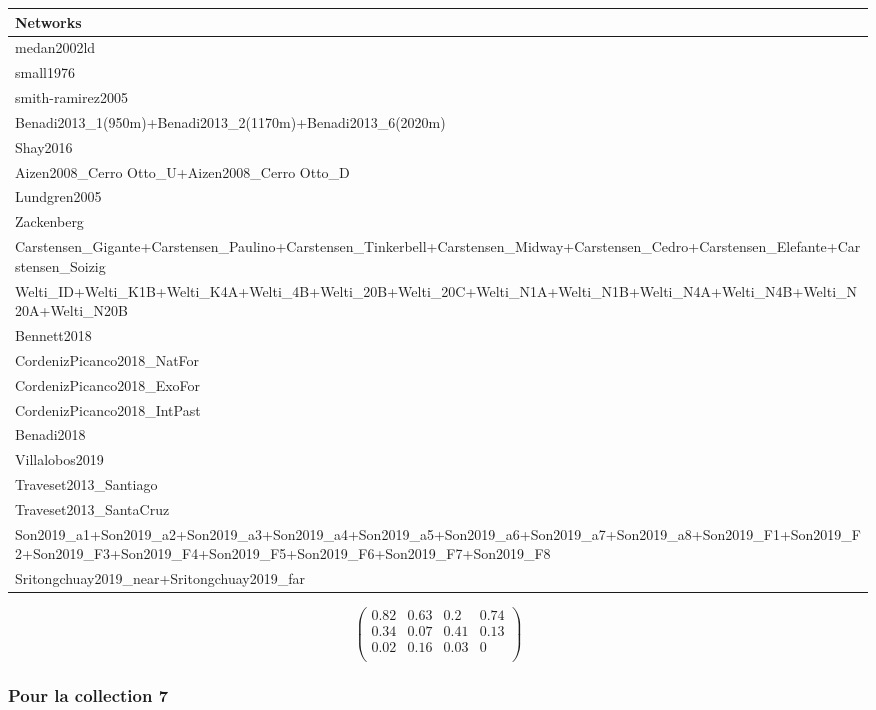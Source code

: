 \begin{tabular}{l}
\toprule
Networks\\
\midrule
medan2002ld\\
small1976\\
smith-ramirez2005\\
Benadi2013\_1(950m)+Benadi2013\_2(1170m)+Benadi2013\_6(2020m)\\
Shay2016\\
\addlinespace
Aizen2008\_Cerro Otto\_U+Aizen2008\_Cerro Otto\_D\\
Lundgren2005\\
Zackenberg\\
Carstensen\_Gigante+Carstensen\_Paulino+Carstensen\_Tinkerbell+Carstensen\_Midway+Carstensen\_Cedro+Carstensen\_Elefante+Carstensen\_Soizig\\
Welti\_ID+Welti\_K1B+Welti\_K4A+Welti\_4B+Welti\_20B+Welti\_20C+Welti\_N1A+Welti\_N1B+Welti\_N4A+Welti\_N4B+Welti\_N20A+Welti\_N20B\\
\addlinespace
Bennett2018\\
CordenizPicanco2018\_NatFor\\
CordenizPicanco2018\_ExoFor\\
CordenizPicanco2018\_IntPast\\
Benadi2018\\
\addlinespace
Villalobos2019\\
Traveset2013\_Santiago\\
Traveset2013\_SantaCruz\\
Son2019\_a1+Son2019\_a2+Son2019\_a3+Son2019\_a4+Son2019\_a5+Son2019\_a6+Son2019\_a7+Son2019\_a8+Son2019\_F1+Son2019\_F2+Son2019\_F3+Son2019\_F4+Son2019\_F5+Son2019\_F6+Son2019\_F7+Son2019\_F8\\
Sritongchuay2019\_near+Sritongchuay2019\_far\\
\bottomrule
\end{tabular}

\normalsize\newline\[\begin{pmatrix} 0.82 &0.63 &0.2 &0.74 \\0.34 &0.07 &0.41 &0.13 \\0.02 &0.16 &0.03 &0 \\ \end{pmatrix}\]

\subsubsection{Pour la collection 7 }

